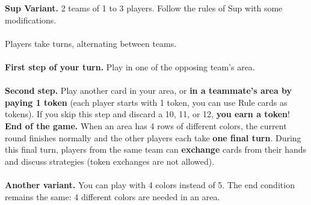 \documentclass[a4paper]{memoir}
\begin{document}
{\footnotesize

\noindent
\textbf{ Sup Variant.} 2 teams of 1 to 3 players. Follow the rules of Sup with some modifications.
\\
\\
\noindent
{} Players take turns, alternating between teams.
\\
\\
\noindent
\textbf{ First step of your turn.} Play in one of the opposing team’s area.
\\
\\
\noindent
\textbf{ Second step.} Play another card in your area, 
or \textbf{in a teammate’s area by paying 1 token} (each player starts with 1 token, you can use Rule cards as tokens). 
If you skip this step and discard a 10, 11, or 12, \textbf{you earn a token}!
\newpage
\noindent
\textbf{ End of the game.} When an area has 4 rows of different colors, the current round finishes normally and the other players each take \textbf{one final turn}. 
During this final turn, players from the same team can \textbf{exchange} cards from their hands and discuss strategies (token exchanges are not allowed).
\noindent
\\
\\
\noindent
\textbf{ Another variant.} You can play with 4 colors instead of 5. The end condition remains the same: 4 different colors are needed in an area.
}
\end{document}
